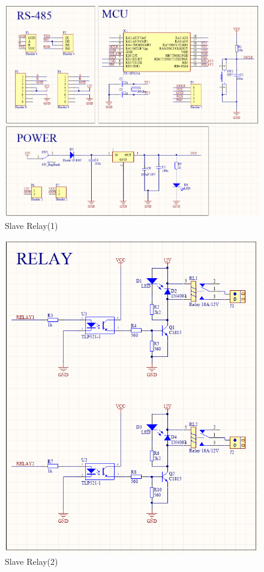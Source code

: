 \begin{figure}[!htbp]
  \begin{center}
  \includegraphics[scale=0.7]{images/slaveRelayFull1.PNG}
  \caption{Slave Relay(1)}
  \label{fig:slaveRelayFull1}
  \end{center}
\end{figure}
\begin{figure}[!ht]
  \begin{center}
  \includegraphics[scale=1]{images/slaveRelayFull2.PNG}
  \caption{Slave Relay(2)}
  \label{fig:slaveRelayFull2}
  \end{center}
\end{figure}